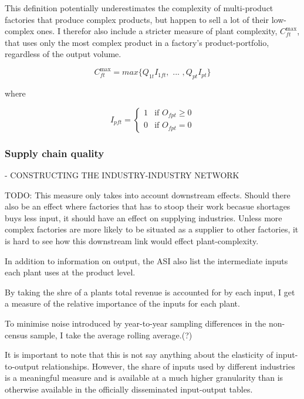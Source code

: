 \documentclass[11pt]{article}
\begin{document}
This definition potentially underestimates the complexity of multi-product factories that produce complex products, but happen to sell a lot of their low-complex ones. I therefor also include a stricter measure of plant complexity, \(C^{\text{max}}_{ft}\), that uses only the most complex product in a factory's product-portfolio, regardless of the output volume.

$$
C^{\text{max}}_{ft} = max \{ Q_{1t} I_{1ft}, \text{ ... }, Q_{pt} I_{pt} \}
$$

where

\[
I_{pft} = \begin{cases}
 1 & \text{if } O_{fpt} \geq 0 \\
 0 & \text{if } O_{fpt} = 0
\end{cases}
\]

\subsubsection{Supply chain quality}%
\label{sub:supply_chain_quality}

- CONSTRUCTING THE INDUSTRY-INDUSTRY NETWORK

TODO: This measure only takes into account downstream effects. Should there also be an effect where factories that has to stoop their work becasue shortages buys less input, it should have an effect on supplying industries. Unless more complex factories are more likely to be situated as a supplier to other factories, it is hard to see how this downstream link would effect plant-complexity.

In addition to information on output, the ASI also list the intermediate inputs each plant uses at the product level.




By taking the shre of a plants total revenue is accounted for by each input, I get a measure of the relative importance of the inputs for each plant. 

To minimise noise introduced by year-to-year sampling differences in the non-census sample, I take the average rolling average.(?)

It is important to note that this is not say anything about the elasticity of input-to-output relationships. However, the share of inputs used by different industries is a meaningful measure and is available at a much higher granularity than is otherwise available in the officially disseminated input-output tables. 

\end{document}

